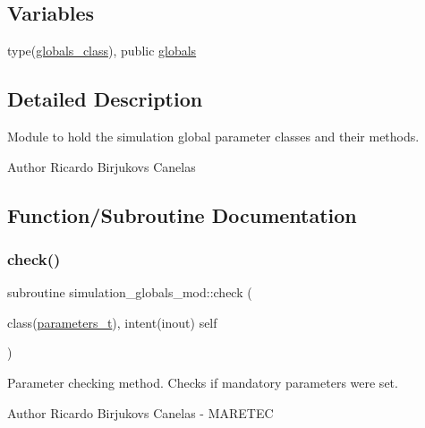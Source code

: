 \subsection*{Variables}
\begin{DoxyCompactItemize}
\item 
type(\mbox{\hyperlink{structsimulation__globals__mod_1_1globals__class}{globals\+\_\+class}}), public \mbox{\hyperlink{namespacesimulation__globals__mod_a04123075b6de525703edb89697fc39e9}{globals}}
\end{DoxyCompactItemize}


\subsection{Detailed Description}
Module to hold the simulation global parameter classes and their methods. 

\begin{DoxyAuthor}{Author}
Ricardo Birjukovs Canelas 
\end{DoxyAuthor}


\subsection{Function/\+Subroutine Documentation}
\mbox{\label{namespacesimulation__globals__mod_a41249abb5c33ef9e8bff448f0b3826fa}} 
\subsubsection{\texorpdfstring{check()}{check()}}
{\footnotesize\ttfamily subroutine simulation\+\_\+globals\+\_\+mod\+::check (\begin{DoxyParamCaption}\item[{class(\mbox{\hyperlink{structsimulation__globals__mod_1_1parameters__t}{parameters\+\_\+t}}), intent(inout)}]{self }\end{DoxyParamCaption})\hspace{0.3cm}{\ttfamily [private]}}



Parameter checking method. Checks if mandatory parameters were set. 

\begin{DoxyAuthor}{Author}
Ricardo Birjukovs Canelas -\/ M\+A\+R\+E\+T\+EC 
\end{DoxyAuthor}


